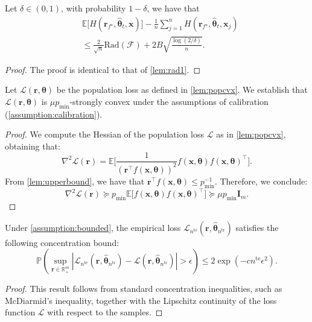 \begin{lemma}
\label{lem:rad2}
    Let $\delta \in (0,1)$, with probability $1-\delta$, we have that
    \begin{equation}
    \begin{aligned}
    &\mathbb{E}\bigg[H(\boldsymbol{r}_{f^\star}, \hat{\boldsymbol{\theta}}_t, \boldsymbol{x}) \bigg] - \frac{1}{n}\sum_{j=1}^{n}H(\boldsymbol{r}_{f^\star}, \hat{\boldsymbol{\theta}}_t, \boldsymbol{x}_j) \\
    & \leq \frac{2}{\sqrt{n}} \text{Rad}(\mathcal{F}) + 2B\sqrt{\frac{\log(2/\delta)}{n}}.
    \end{aligned}
    \end{equation}
\end{lemma}

\begin{proof}
    The proof is identical to that of \cref{lem:rad1}.
\end{proof}

\begin{lemma}
\label{lem:popcvx}
    Let $\mathcal{L}(\boldsymbol{r}, \boldsymbol{\theta})$ be the population loss as defined in \cref{lem:popcvx}. We establish that $\mathcal{L}(\boldsymbol{r}, \boldsymbol{\theta})$ is $\mu p_{\min}$-strongly convex under the assumptions of calibration (\cref{assumption:calibration}).
\end{lemma}

\begin{proof}
    We compute the Hessian of the population loss $\mathcal{L}$ as in \cref{lem:popcvx}, obtaining that:
    \[
    \nabla^2 \mathcal{L}(\boldsymbol{r}) = \mathbb{E}\bigg[\frac{1}{(\boldsymbol{r}^\top f(\boldsymbol{x}, \boldsymbol{\theta}))^2} f(\boldsymbol{x}, \boldsymbol{\theta}) f(\boldsymbol{x}, \boldsymbol{\theta})^\top\bigg].
    \]
    From \cref{lem:upperbound}, we have that $\boldsymbol{r}^\top f(\boldsymbol{x}, \boldsymbol{\theta}) \leq p_{\min}^{-1}$. Therefore, we conclude:
    \[
    \nabla^2 \mathcal{L}(\boldsymbol{r}) \succeq p_{\min} \mathbb{E}\bigg[f(\boldsymbol{x}, \boldsymbol{\theta}) f(\boldsymbol{x}, \boldsymbol{\theta})^\top\bigg] \succeq \mu p_{\min} \mathbf{I}_m.
    \]
\end{proof}

\begin{lemma}
\label{lem:empcvx}
    Under \cref{assumption:bounded}, the empirical loss $\mathcal{L}_{{n}^{\text{te}}}(\boldsymbol{r}, \hat{\boldsymbol{\theta}}_{{n}^{\text{tr}}})$ satisfies the following concentration bound:
    \[
    \mathbb{P}\left( \sup_{\boldsymbol{r} \in \mathbb{R}_{+}^m} \left| \mathcal{L}_{{n}^{\text{te}}}(\boldsymbol{r}, \hat{\boldsymbol{\theta}}_{{n}^{\text{tr}}}) - \mathcal{L}(\boldsymbol{r}, \hat{\boldsymbol{\theta}}_{{n}^{\text{tr}}}) \right| > \epsilon \right) \leq 2\exp\left(-c {n}^{\text{te}} \epsilon^2\right).
    \]
\end{lemma}

\begin{proof}
    This result follows from standard concentration inequalities, such as McDiarmid's inequality, together with the Lipschitz continuity of the loss function $\mathcal{L}$ with respect to the samples.
\end{proof}

